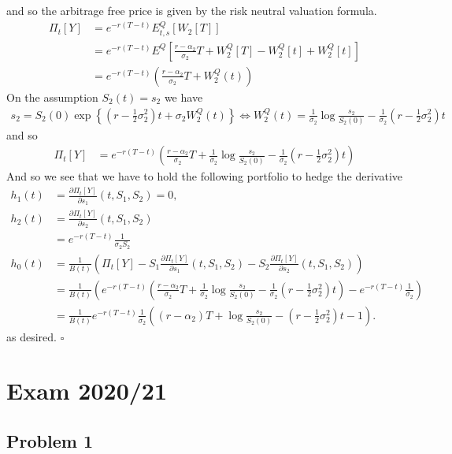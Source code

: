 \documentclass[a4paper,12pt,openany]{book}
\begin{document}
and so the arbitrage free price is given by the risk neutral valuation formula.
\begin{align*}
\Pi_t[Y]&=e^{-r(T-t)}E^Q_{t,s}\left[W_2[T]\right]\\
&=e^{-r(T-t)}E^Q\left[\frac{r-\alpha_2}{\sigma_2} T+W_2^Q[T]-W_2^Q[t]+W_2^Q[t]\right]\\
&=e^{-r(T-t)}\left(\frac{r-\alpha_2}{\sigma_2} T+W_2^Q(t)\right)
\end{align*}
On the assumption \(S_2(t)=s_2\) we have
\begin{align*}
s_2=S_2(0)\exp\left\{\left(r-\frac{1}{2}\sigma_2^2\right)t+\sigma_2 W_2^Q(t)\right\}\iff W_2^Q(t)=\frac{1}{\sigma_2}\log\frac{s_2}{S_2(0)}-\frac{1}{\sigma_2}\left(r-\frac{1}{2}\sigma_2^2\right)t
\end{align*}
and so
\begin{align*}
\Pi_t[Y]&=e^{-r(T-t)}\left(\frac{r-\alpha_2}{\sigma_2} T+\frac{1}{\sigma_2}\log\frac{s_2}{S_2(0)}-\frac{1}{\sigma_2}\left(r-\frac{1}{2}\sigma_2^2\right)t\right)
\end{align*}
And so we see that we have to hold the following portfolio to hedge the derivative
\begin{align*}
h_1(t)&=\frac{\partial \Pi_t[Y]}{\partial s_1}(t,S_1,S_2)=0,\\
h_2(t)&=\frac{\partial \Pi_t[Y]}{\partial s_2}(t,S_1,S_2)\\
&=e^{-r(T-t)}\frac{1}{\sigma_2S_2}\\
h_0(t) &=\frac{1}{B(t)}\left(\Pi_t[Y]-S_1\frac{\partial \Pi_t[Y]}{\partial s_1}(t,S_1,S_2)-S_2\frac{\partial \Pi_t[Y]}{\partial s_2}(t,S_1,S_2)\right) \\
&=\frac{1}{B(t)}\left(e^{-r(T-t)}\left(\frac{r-\alpha_2}{\sigma_2} T+\frac{1}{\sigma_2}\log\frac{s_2}{S_2(0)}-\frac{1}{\sigma_2}\left(r-\frac{1}{2}\sigma_2^2\right)t\right)-e^{-r(T-t)}\frac{1}{\sigma_2}\right)\\
&=\frac{1}{B(t)}e^{-r(T-t)}\frac{1}{\sigma_2}\left((r-\alpha_2) T+\log\frac{s_2}{S_2(0)}-\left(r-\frac{1}{2}\sigma_2^2\right)t-1\right).
\end{align*}
as desired. \(\square\)

\noindent\makebox[\linewidth]{\rule{\textwidth}{0.4pt}}
\pagebreak

\hypertarget{exam-202021}{%
\section{Exam 2020/21}\label{exam-202021}}

\hypertarget{problem-1-3}{%
\subsection{Problem 1}\label{problem-1-3}}
\end{document}
